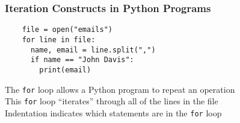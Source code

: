 \documentclass[14pt,aspectratio=169]{beamer}
\begin{document}
%
\begin{frame}[fragile]
  \frametitle{Iteration Constructs in Python Programs}
  \normalsize
  \hspace*{-.65in}
  \begin{minipage}{6in}
    \vspace*{.25in}
    \begin{verbatim}
    file = open("emails")
    for line in file:
      name, email = line.split(",")
      if name == "John Davis":
        print(email)
    \end{verbatim}
  \end{minipage}
  \vspace*{.25in}
  \begin{center}
    \normalsize \noindent The {\tt for} loop allows a Python program to repeat an operation \\
    \normalsize \noindent This {\tt for} loop ``iterates'' through all of the lines in the file \\
    \normalsize \noindent Indentation indicates which statements are in the {\tt for} loop \\
  \end{center}
\end{frame}
\end{document}
